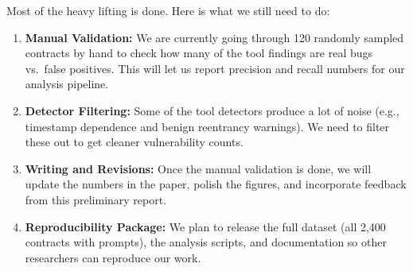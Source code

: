 \documentclass[11pt]{article}
\begin{document}
Most of the heavy lifting is done. Here is what we still need to do:

\begin{enumerate}[leftmargin=*]
    \item \textbf{Manual Validation:} We are currently going through 120 randomly sampled contracts by hand to check how many of the tool findings are real bugs vs.\ false positives. This will let us report precision and recall numbers for our analysis pipeline.
    \item \textbf{Detector Filtering:} Some of the tool detectors produce a lot of noise (e.g., timestamp dependence and benign reentrancy warnings). We need to filter these out to get cleaner vulnerability counts.
    \item \textbf{Writing and Revisions:} Once the manual validation is done, we will update the numbers in the paper, polish the figures, and incorporate feedback from this preliminary report.
    \item \textbf{Reproducibility Package:} We plan to release the full dataset (all 2,400 contracts with prompts), the analysis scripts, and documentation so other researchers can reproduce our work.
\end{enumerate}

\end{document}
